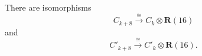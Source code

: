 There are isomorphisms
$$C_{k+8} \xrightarrow{\cong} C_k \otimes \mathbf{R}(16)$$
and
$$C'_{k+8} \xrightarrow{\cong} C'_k \otimes \mathbf{R}(16).$$
